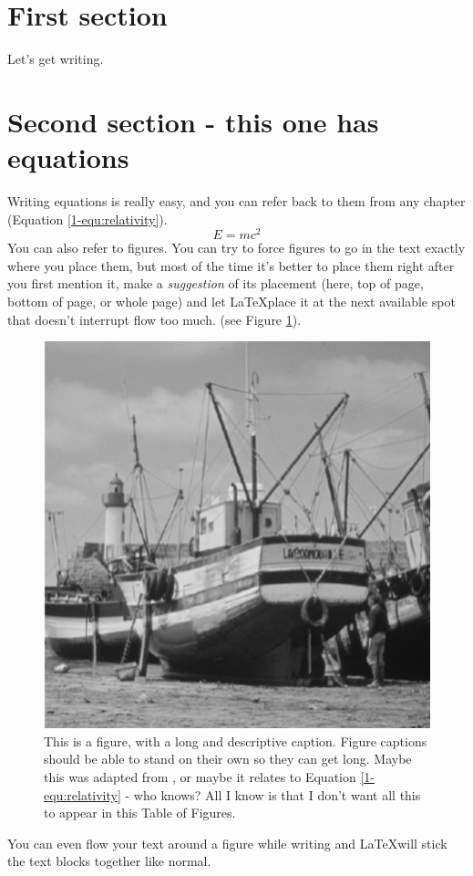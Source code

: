 \section{First section}
Let's get writing. 

\section{Second section - this one has equations}
Writing equations is really easy, and you can refer back to them from any chapter (Equation \ref{1-equ:relativity}).
%
\begin{equation}
    \label{1-equ:relativity}
    E = mc^2
\end{equation}
%
You can also refer to figures. You can try to force figures to go in the text exactly where you place them, but most of the time it's better to place them right after you first mention it, make a \textit{suggestion} of its placement (here, top of page, bottom of page, or whole page) and let \LaTeX place it at the next available spot that doesn't interrupt flow too much. (see Figure \ref{1-fig:boats}). 
%
\begin{figure}[htbp]
    \centering
    \includegraphics[width=0.75\linewidth]{figures/C1_general_intro/boat.png}
    \caption[This is a figure with an alternative caption]{This is a figure, with a long and descriptive caption. Figure captions should be able to stand on their own so they can get long. Maybe this was adapted from \citet{alexander_navigating_2016}, or maybe it relates to Equation \ref{1-equ:relativity} - who knows? All I know is that I don't want all this to appear in this Table of Figures.} 
    \label{1-fig:boats}
\end{figure}
%
You can even flow your text around a figure while writing and \LaTeX will stick the text blocks together like normal. 

